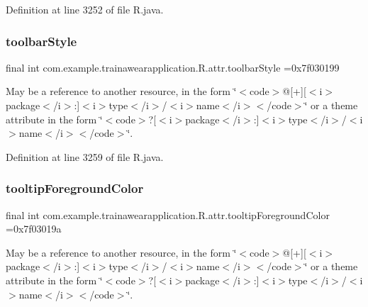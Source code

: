 Definition at line 3252 of file R.\+java.

\mbox{\label{classcom_1_1example_1_1trainawearapplication_1_1_r_1_1attr_a24aa9f7f775e768fb50c5284f9e0f482}} 
\subsubsection{\texorpdfstring{toolbarStyle}{toolbarStyle}}
{\footnotesize\ttfamily final int com.\+example.\+trainawearapplication.\+R.\+attr.\+toolbar\+Style =0x7f030199\hspace{0.3cm}{\ttfamily [static]}}

May be a reference to another resource, in the form \char`\"{}$<$code$>$@\mbox{[}+\mbox{]}\mbox{[}$<$i$>$package$<$/i$>$\+:\mbox{]}$<$i$>$type$<$/i$>$/$<$i$>$name$<$/i$>$$<$/code$>$\char`\"{} or a theme attribute in the form \char`\"{}$<$code$>$?\mbox{[}$<$i$>$package$<$/i$>$\+:\mbox{]}$<$i$>$type$<$/i$>$/$<$i$>$name$<$/i$>$$<$/code$>$\char`\"{}. 

Definition at line 3259 of file R.\+java.

\mbox{\label{classcom_1_1example_1_1trainawearapplication_1_1_r_1_1attr_ae905b136fb9dcb8842c5f02cc2aba1bd}} 
\subsubsection{\texorpdfstring{tooltipForegroundColor}{tooltipForegroundColor}}
{\footnotesize\ttfamily final int com.\+example.\+trainawearapplication.\+R.\+attr.\+tooltip\+Foreground\+Color =0x7f03019a\hspace{0.3cm}{\ttfamily [static]}}

May be a reference to another resource, in the form \char`\"{}$<$code$>$@\mbox{[}+\mbox{]}\mbox{[}$<$i$>$package$<$/i$>$\+:\mbox{]}$<$i$>$type$<$/i$>$/$<$i$>$name$<$/i$>$$<$/code$>$\char`\"{} or a theme attribute in the form \char`\"{}$<$code$>$?\mbox{[}$<$i$>$package$<$/i$>$\+:\mbox{]}$<$i$>$type$<$/i$>$/$<$i$>$name$<$/i$>$$<$/code$>$\char`\"{}. 

